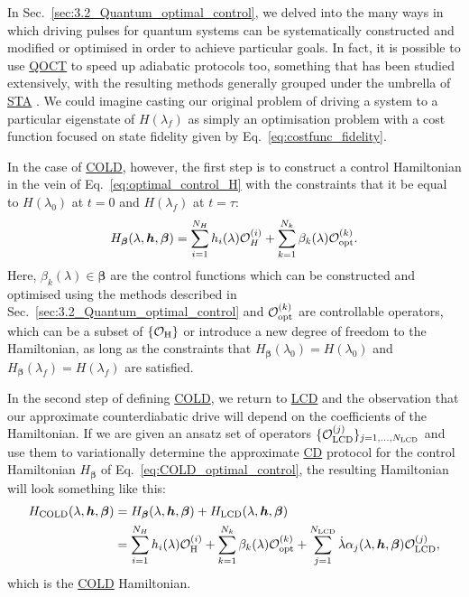 \documentclass[a4paper,oneside,11pt]{book}
\newcommand{\betabb}{\boldsymbol{\beta}}
\newcommand{\hbb}{\boldsymbol{h}}
\newcommand{\dotlambda}{\dot{\lambda}}
\newcommand{\acrref}[1]{\hyperref[acr:#1]{#1}}
\begin{document}
In Sec.~\ref{sec:3.2_Quantum_optimal_control}, we delved into the many ways in which driving pulses for quantum systems can be systematically constructed and modified or optimised in order to achieve particular goals. In fact, it is possible to use \acrref{QOCT} to speed up adiabatic protocols too, something that has been studied extensively, with the resulting methods generally grouped under the umbrella of \acrref{STA} \cite{guery-odelin_shortcuts_2019, torrontegui_chapter_2013}. We could imagine casting our original problem of driving a system to a particular eigenstate of $H(\lambda_f)$ as simply an optimisation problem with a cost function focused on state fidelity given by Eq.~\eqref{eq:costfunc_fidelity}. 

In the case of \acrref{COLD}, however, the first step is to construct a control Hamiltonian in the vein of Eq.~\eqref{eq:optimal_control_H} with the constraints that it be equal to $H(\lambda_0)$ at $t=0$ and $H(\lambda_f)$ at $t=\tau$:
\begin{equation}\label{eq:COLD_optimal_control}
    H_{\betabb}(\lambda, \hbb, \betabb) = \sum_{i = 1}^{N_H} h_i(\lambda) \mathcal{O}_H^{(i)} + \sum_{k = 1}^{N_k} \beta_k(\lambda) \mathcal{O}_{\rm opt}^{(k)}.
\end{equation}
Here, $\beta_k(\lambda) \in \betabb$ are the control functions which can be constructed and optimised using the methods described in Sec.~\ref{sec:3.2_Quantum_optimal_control} and $\mathcal{O}_{\rm opt}^{(k)}$ are controllable operators, which can be a subset of $\{\mathcal{O}_{\rm H}\}$ or introduce a new degree of freedom to the Hamiltonian, as long as the constraints that $H_{\betabb}(\lambda_0) = H(\lambda_0)$ and $H_{\betabb}(\lambda_f) = H(\lambda_f)$ are satisfied. 

In the second step of defining \acrref{COLD}, we return to \acrref{LCD} and the observation that our approximate counterdiabatic drive will depend on the coefficients of the Hamiltonian. If we are given an ansatz set of operators $\{\mathcal{O}_{\rm LCD}^{(j)}\}_{j = 1, ..., N_{\rm LCD}}$ and use them to variationally determine the approximate \acrref{CD} protocol for the control Hamiltonian $H_{\betabb}$ of Eq.~\eqref{eq:COLD_optimal_control}, the resulting Hamiltonian will look something like this:
\begin{equation}\label{eq:COLD_Hamiltonian}
    \begin{aligned}
        H_{\rm COLD}(\lambda, \hbb, \betabb) &= H_{\betabb}(\lambda, \hbb, \betabb) + H_{\rm LCD}(\lambda, \hbb, \betabb) \\
        &= \sum_{i = 1}^{N_H} h_i(\lambda) \mathcal{O}_{\rm H}^{(i)} + \sum_{k = 1}^{N_k} \beta_k(\lambda) \mathcal{O}_{\rm opt}^{(k)} + \sum_{j = 1}^{N_{\rm LCD}} \dotlambda \alpha_{j}(\lambda, \hbb, \betabb) \mathcal{O}_{\rm LCD}^{(j)},
    \end{aligned}
\end{equation}
which is the \acrref{COLD} Hamiltonian. 
\end{document}
